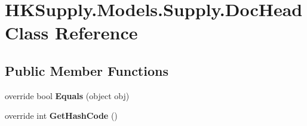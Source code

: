 \hypertarget{class_h_k_supply_1_1_models_1_1_supply_1_1_doc_head}{}\section{H\+K\+Supply.\+Models.\+Supply.\+Doc\+Head Class Reference}
\label{class_h_k_supply_1_1_models_1_1_supply_1_1_doc_head}
\subsection*{Public Member Functions}
\begin{DoxyCompactItemize}
\item 
\mbox{\label{class_h_k_supply_1_1_models_1_1_supply_1_1_doc_head_af09fc92a3e9be4bd073af41ca15141f7}} 
override bool {\bfseries Equals} (object obj)
\item 
\mbox{\label{class_h_k_supply_1_1_models_1_1_supply_1_1_doc_head_ac585e668d0b47cd9b733bd5bdee52ed5}} 
override int {\bfseries Get\+Hash\+Code} ()
\end{DoxyCompactItemize}
